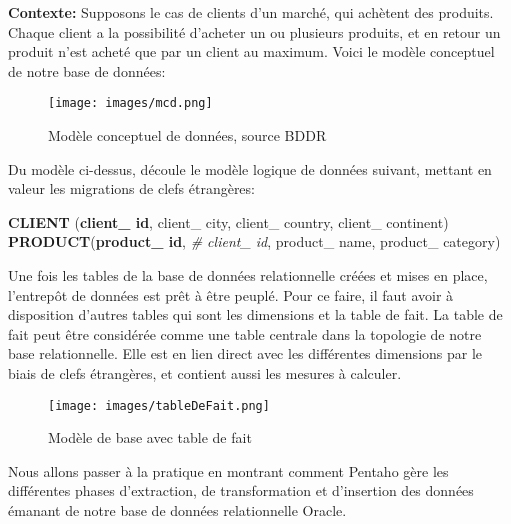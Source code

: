 \documentclass[12pt,a4wide,twoside]{report}
\begin{document}
\textbf{Contexte:}\newline 
Supposons le cas de clients d'un marché, qui achètent des produits. Chaque client a la possibilité d'acheter un ou plusieurs produits, et en retour un produit n'est acheté que par un client au maximum. Voici le modèle conceptuel de notre base de données:
\begin{figure}[!h]
\begin{center}
			\texttt{[image: images/mcd.png]}
\end{center}
\caption{Modèle conceptuel de données, source BDDR}
\end{figure} \newline
Du modèle ci-dessus, découle le modèle logique de données suivant, mettant en valeur les migrations de clefs étrangères:\newline
\begin{center}
\textbf{CLIENT} (\textbf{client\_ id}, client\_ city, client\_ country, client\_ continent) \newline
\textbf{PRODUCT}(\textbf{product\_ id}, \emph{\# client\_ id}, product\_ name, product\_ category)
\end{center}
Une fois les tables de la base de données relationnelle créées et mises en place, l'entrepôt de données est prêt à être peuplé. Pour ce faire, il faut avoir à disposition d'autres tables qui sont les dimensions et la table de fait.\newline 
La table de fait peut être considérée comme une table centrale dans la topologie de notre base relationnelle. Elle est en lien direct avec les différentes dimensions par le biais de clefs étrangères, et contient aussi les mesures à calculer.\newline
\begin{figure}[!h]
\begin{center}
			\texttt{[image: images/tableDeFait.png]}
\end{center}
\caption{Modèle de base avec table de fait}
\end{figure}
\newpage
Nous allons passer à la pratique en montrant comment Pentaho gère les différentes phases d'extraction, de transformation et d'insertion des données émanant de notre base de données relationnelle Oracle.\newline 
\end{document}
